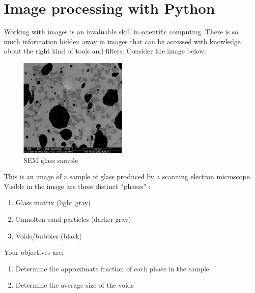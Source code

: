 \documentclass{article}
\begin{document}
\section*{Image processing with Python}

Working with images is an invaluable skill in scientific computing. There is so
much information hidden away in images that can be accessed with knowledge about
the right kind of tools and filters.
\newline \newline
Consider the image below:
\begin{figure}[h]
\begin{center}
\includegraphics[width=150pt]{../pictures/MV_HFV_012.jpg}
\caption{SEM glass sample}
\end{center}
\end{figure}
\newline
This is an image of a sample of glass produced by a scanning electron microscope.
Visible in the image are three distinct ``phases'' : 
\begin{enumerate}
\item Glass matrix (light gray)
\item Unmolten sand particles (darker gray)
\item Voids/bubbles (black)
\newline
\end{enumerate} 
Your objectives are:
\begin{enumerate}
\item Determine the approximate fraction of each phase in the sample
\item Determine the average size of the voids
\end{enumerate} 
\end{document}
